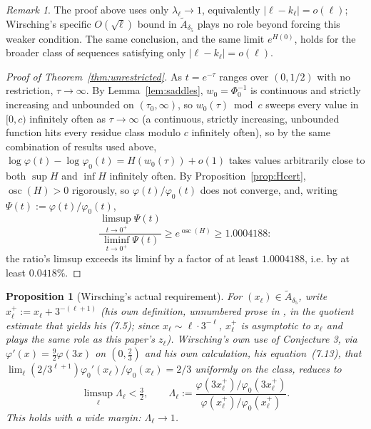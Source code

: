 \documentclass[11pt]{article}
\newtheorem{proposition}[theorem]{Proposition}
\theoremstyle{definition}
\theoremstyle{remark}
\newtheorem{remark}[theorem]{Remark}
\begin{document}
\begin{remark}
The proof above uses only $\lambda_\ell\to1$, equivalently $|\ell-k_\ell|=o(\ell)$; Wirsching's specific
$O(\sqrt \ell)$ bound in $\widetilde{A}_{\delta_5}$ plays no role beyond forcing this weaker condition. The
same conclusion, and the same limit $e^{H(0)}$, holds for the broader class of sequences satisfying
only $|\ell-k_\ell|=o(\ell)$.
\end{remark}

\begin{proof}[Proof of Theorem~\ref{thm:unrestricted}]
As $t=e^{-\tau}$ ranges over $(0,1/2)$ with no restriction, $\tau\to\infty$. By
Lemma~\ref{lem:saddles}, $w_0=\Phi_0^{-1}$ is continuous and strictly increasing and unbounded on
$(\tau_0,\infty)$, so $w_0(\tau)\bmod c$ sweeps every value in $[0,c)$ infinitely often as
$\tau\to\infty$ (a continuous, strictly increasing, unbounded function hits every residue class
modulo $c$ infinitely often), so by the same combination of results used above,
$\log\varphi(t)-\log\varphi_0(t) = H(w_0(\tau))+o(1)$ takes values arbitrarily close to both $\sup H$
and $\inf H$ infinitely often. By Proposition~\ref{prop:Hcert}, $\operatorname{osc}(H) > 0$
rigorously, so $\varphi(t)/\varphi_0(t)$ does not converge, and, writing $\Psi(t) :=
\varphi(t)/\varphi_0(t)$,
\[
\frac{\limsup_{t\to0^+}\Psi(t)}{\liminf_{t\to0^+}\Psi(t)} \ge e^{\operatorname{osc}(H)} \ge 1.0004188:
\]
the ratio's limsup exceeds its liminf by a factor of at least $1.0004188$, i.e. by at least
$0.0418\%$.
\end{proof}

\begin{proposition}[Wirsching's actual requirement]
\label{prop:wirschingreq}
For $(x_\ell)\in\widetilde A_{\delta_5}$, write $x_\ell^+ := x_\ell + 3^{-(\ell+1)}$ (his own definition, unnumbered
prose in \cite[\S7, p.~785]{Wirsching2003}, in the quotient estimate that
yields his (7.5); since
$x_\ell\sim \ell\cdot3^{-\ell}$, $x_\ell^+$ is asymptotic to $x_\ell$ and plays the same role as this paper's
$z_\ell$). Wirsching's own use of Conjecture 3, via $\varphi'(x)=\tfrac92\varphi(3x)$ on $(0,\tfrac23)$
and his own calculation, his equation~(7.13), that $\lim_\ell (2/3^{\ell+1})\varphi_0'(x_\ell)/\varphi_0(x_\ell)
= 2/3$ uniformly on the class, reduces to
\[
\limsup_\ell \Lambda_\ell < \tfrac32, \qquad
\Lambda_\ell := \frac{\varphi(3x_\ell^+)/\varphi_0(3x_\ell^+)}{\varphi(x_\ell^+)/\varphi_0(x_\ell^+)}.
\]
This holds with a wide margin: $\Lambda_\ell \to 1$.
\end{proposition}
\end{document}
